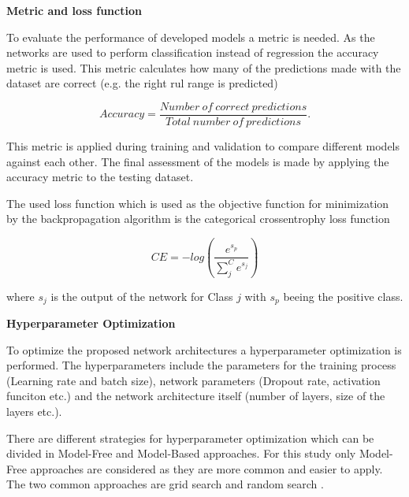\documentclass[conference]{IEEEtran}
\begin{document}


\noindent
\textbf{Metric and loss function}

To evaluate the performance of developed models a metric is needed. As the networks are used to perform classification instead of regression the accuracy metric is used. This metric calculates how many of the predictions made with the dataset are correct (e.g. the right \gls{rul} range is predicted)

\begin{equation}
	\label{eq:categorical-cross-entrophy}
	Accuracy = \frac{Number \: of \: correct \: predictions}{Total \: number \: of \: predictions}.
\end{equation}

This metric is applied during training and validation to compare different models against each other. The final assessment of the models is made by applying the accuracy metric to the testing dataset.

The used loss function which is used as the objective function for minimization by the backpropagation algorithm is the categorical crossentrophy loss function

\begin{equation}
	\label{eq:categorical-cross-entrophy}
	CE = -log(\frac{e^{s_p}}{\sum_{j}^{C} e^{s_j}})	
\end{equation}

where $ s_j $ is the output of the network for Class $ j $ with $ s_p $ beeing the positive class.


\noindent
\textbf{Hyperparameter Optimization}

To optimize the proposed network architectures a hyperparameter optimization is performed. The hyperparameters include the parameters for the training process (Learning rate and batch size), network parameters (Dropout rate, activation funciton etc.) and the network architecture itself (number of layers, size of the layers etc.).

There are different strategies for hyperparameter optimization which can be divided in Model-Free and Model-Based approaches. For this study only Model-Free approaches are considered as they are more common and easier to apply. The two common approaches are grid search and random search \cite{Feurer2019}. 
\end{document}

